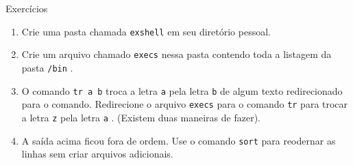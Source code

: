 \documentclass[12pt]{article}
\newcommand{\aframe}[1]{
\Large
\begin{center}
#1
\end{center}
\vfill
\newpage
}
\newcommand{\tit}[1]{
{\LARGE \color{green} #1}
\\ \vspace{0.5cm}
\vfill
}
\newcommand{\cmdinline}[1]{
{\color{yellow} \tt #1} }
\begin{document}
\aframe{
\tit{Exercícios}
\begin{enumerate}
  \item Crie uma pasta chamada \cmdinline{exshell} em seu 
    diretório pessoal.
  \item Crie um arquivo chamado \cmdinline{execs} nessa pasta 
    contendo toda a listagem da pasta \cmdinline{/bin}.
  \item O comando \cmdinline{tr a b} troca a letra \cmdinline{a} pela
    letra \cmdinline{b} de algum texto redirecionado para o comando.
    Redirecione o arquivo \cmdinline{execs} para o comando \cmdinline{tr} para
    trocar a letra \cmdinline{z} pela letra \cmdinline{a}. (Existem duas
    maneiras de fazer).
  \item A saída acima ficou fora de ordem. Use o comando \cmdinline{sort} para
    reodernar as linhas sem criar arquivos adicionais.
\end{enumerate}
}
\end{document}
